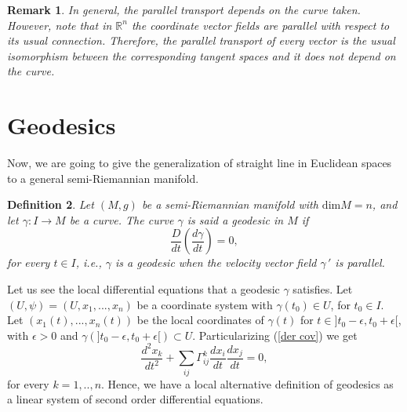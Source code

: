\documentclass[11pt]{book}
\newtheorem{defi}{Definition}[chapter]
\newtheorem{rem}[defi]{Remark}
\def\R{\mathbb R}
\begin{document}
\begin{rem}
	{\rm In general, the parallel transport depends on the curve taken. However, note that in $\R^n$ the coordinate vector fields are parallel with respect to its usual connection. Therefore, the parallel transport of every vector is the usual isomorphism between the corresponding tangent spaces and it does not depend on the curve.
	}
\end{rem}

\section{Geodesics}
Now, we are going to give the generalization of straight line in Euclidean spaces to a general semi-Riemannian manifold. 
\begin{defi}
	Let $(M,g)$ be a semi-Riemannian manifold with $\text{dim}M=n$, and let $\gamma:I\to M$ be a curve. The curve $\gamma$ is said a geodesic in $M$ if
	\begin{equation}
		\frac{D}{dt}\left(\frac{d\gamma}{dt}\right)=0,
	\end{equation}
	for every $t\in I$, i.e., $\gamma$ is a geodesic when the velocity vector field $\gamma{\,'}$ is parallel. 
\end{defi}

Let us see the local differential equations that a geodesic $\gamma$ satisfies. 
Let $(U,\psi)=(U,x_1,...,x_n)$ be a coordinate system with $\gamma(t_0)\in U$, for $t_0\in I$. Let $(x_1(t),...,x_n(t))$ be the local coordinates of $\gamma(t)$ for $t\in]t_0-\epsilon, t_0+\epsilon[$, with $\epsilon>0$ and $\gamma\left(]t_0-\epsilon,t_0+\epsilon[\right)\subset U$. Particularizing (\ref{der cov}) we get
\begin{equation}\label{ec geodesic}
	\frac{d^2 x_k}{dt^2}+\sum_{ij} \Gamma_{ij}^k \frac{dx_i}{dt} \frac{dx_j}{dt}=0,
\end{equation}
for every $k=1,..,n$. Hence, we have a local alternative definition of geodesics as a linear system of second order differential equations.	
\end{document}
